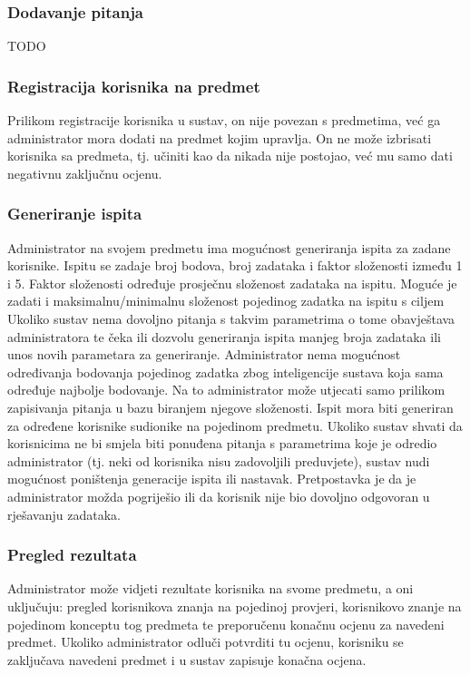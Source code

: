 \documentclass[times, utf8, zavrsni]{fer}
\begin{document}
\subsubsection{Dodavanje pitanja}
TODO

\subsubsection{Registracija korisnika na predmet}
Prilikom registracije korisnika u sustav, on nije povezan s predmetima, već ga administrator mora dodati na predmet kojim upravlja. On ne može izbrisati korisnika sa predmeta, tj. učiniti kao da nikada nije postojao, već mu samo dati negativnu zaključnu ocjenu.

\subsubsection{Generiranje ispita}
Administrator na svojem predmetu ima mogućnost generiranja ispita za zadane korisnike. Ispitu se zadaje broj bodova, broj zadataka i faktor složenosti između 1 i 5. Faktor složenosti određuje prosječnu složenost zadataka na ispitu. Moguće je zadati i maksimalnu/minimalnu složenost pojedinog zadatka na ispitu s ciljem 
Ukoliko sustav nema dovoljno pitanja s takvim parametrima o tome obavještava administratora te čeka ili dozvolu generiranja ispita manjeg broja zadataka ili unos novih parametara za generiranje.
Administrator nema mogućnost određivanja bodovanja pojedinog zadatka zbog inteligencije sustava koja sama određuje najbolje bodovanje. Na to administrator može utjecati samo prilikom zapisivanja pitanja u bazu biranjem njegove složenosti.
Ispit mora biti generiran za određene korisnike sudionike na pojedinom predmetu. Ukoliko sustav shvati da korisnicima ne bi smjela biti ponuđena pitanja s parametrima koje je odredio administrator (tj. neki od korisnika nisu zadovoljili preduvjete), sustav nudi mogućnost poništenja generacije ispita ili nastavak. Pretpostavka je da je administrator možda pogriješio ili da korisnik nije bio dovoljno odgovoran u rješavanju zadataka.

\subsubsection{Pregled rezultata}
Administrator može vidjeti rezultate korisnika na svome predmetu, a oni uključuju: pregled korisnikova znanja na pojedinoj provjeri, korisnikovo znanje na pojedinom konceptu tog predmeta te preporučenu konačnu ocjenu za navedeni predmet.
Ukoliko administrator odluči potvrditi tu ocjenu, korisniku se zaključava navedeni predmet i u sustav zapisuje konačna ocjena.
\end{document}
